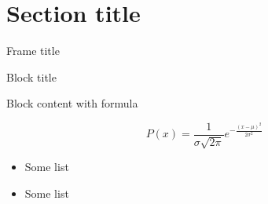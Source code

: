 \section{Section title}

	\begin{frame}{Frame title}

		\begin{fixblock}{Block title}

			Block content with formula

			\[
				P(x) = \frac{1}{{\sigma \sqrt{ 2 \pi } }} e^{ - \frac{(x - \mu)^2}{2 \sigma^2} }
			\]

		\end{fixblock}

		\begin{itemize}
			\item Some list
			\item Some list
		\end{itemize}


	\end{frame}

